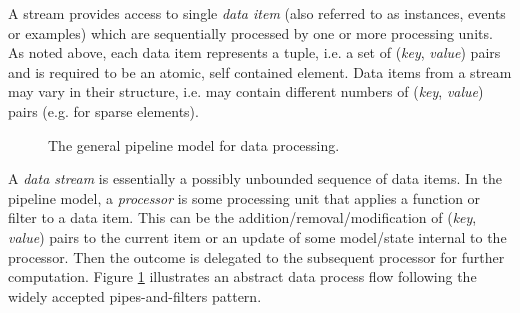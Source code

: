 

A stream provides access to single {\em data item} (also referred to
as instances, events or examples) which are sequentially processed by
one or more processing units. As noted above, each data item
represents a tuple, i.e. a set of ({\em key}, {\em value}) pairs and
is required to be an atomic, self contained element. Data items from a
stream may vary in their structure, i.e. may contain different numbers
of ({\em key}, {\em value}) pairs (e.g. for sparse elements).



\begin{figure}[h!]

  \begin{center}
{\footnotesize
}
    \caption{\label{fig:pipeline}The general pipeline model for data processing.}
  \end{center}
\end{figure}

A {\em data stream} is essentially a possibly unbounded sequence of
data items. In the pipeline model, a {\em processor} is some
processing unit that applies a function or filter to a data item. This
can be the addition/removal/modification of ({\em key}, {\em value})
pairs to the current item or an update of some model/state internal to
the processor. Then the outcome is delegated to the subsequent
processor for further computation. Figure \ref{fig:pipeline}
illustrates an abstract data process flow following the widely
accepted pipes-and-filters pattern.

